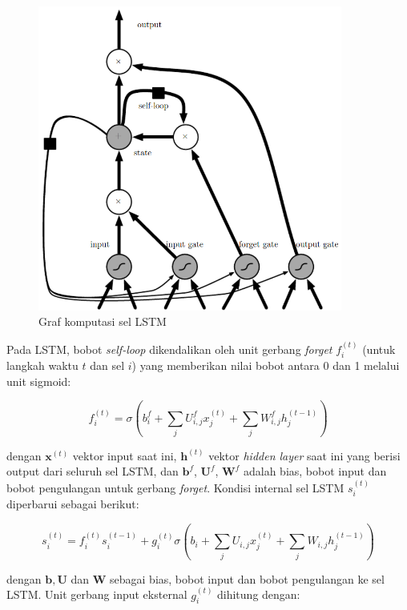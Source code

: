 \begin{figure}
    \centering
    \includegraphics[width=10cm]{gambar/landasan-teori/lstm.png}
    \caption{Graf komputasi sel LSTM \Parencite{Goodfellow-2016}}
    \label{gambar:lstm}
\end{figure}

Pada LSTM, bobot \textit{self-loop} dikendalikan oleh unit gerbang \textit{forget} $f_{i}^{(t)}$ (untuk langkah waktu $t$ dan sel $i$) yang memberikan nilai bobot antara 0 dan 1 melalui unit sigmoid:

\begin{equation}
    f_{i}^{(t)} = \sigma\left(b_{i}^{f} + \sum_{j} U_{i,j}^{f} x_{j}^{(t)} + \sum_{j} W_{i,j}^{f} h_{j}^{(t-1)}\right)
\end{equation}

\noindent
dengan $\pmb{x}^{(t)}$ vektor input saat ini, $\pmb{h}^{(t)}$ vektor \textit{hidden layer} saat ini yang berisi output dari seluruh sel LSTM, dan $\pmb{b}^{f}$, $\pmb{U}^{f}$, $\pmb{W}^{f}$ adalah bias, bobot input dan bobot pengulangan untuk gerbang \textit{forget}. Kondisi internal sel LSTM $s_{i}^{(t)}$ diperbarui sebagai berikut:

\begin{equation}
    s_{i}^{(t)} = f_{i}^{(t)}  s_{i}^{(t-1)} + g_{i}^{(t)} \sigma\left(b_{i} + \sum_{j} U_{i,j} x_{j}^{(t)} + \sum_{j} W_{i,j} h_{j}^{(t-1)} \right)
\end{equation}

\noindent
dengan $\pmb{b}, \pmb{U}$ dan $\pmb{W}$ sebagai bias, bobot input dan bobot pengulangan ke sel LSTM\@. Unit gerbang input eksternal $g_{i}^{(t)}$ dihitung dengan:

